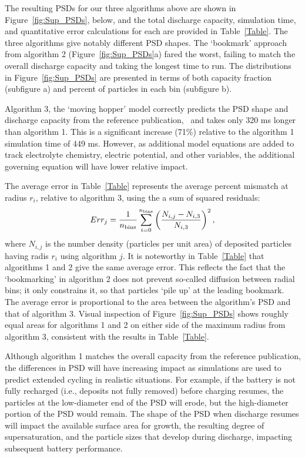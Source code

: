 \documentclass[final,3p,times,twocolumn, 12pt]{elsarticle}
\begin{document}
The resulting PSDs for our three algorithms above are shown in Figure~\ref{fig:Sup_PSDs}, below, and the total discharge capacity, simulation time, and quantitative error calculations for each are provided in Table~\ref{Table}. The three algorithms give notably different PSD shapes. The `bookmark' approach from algorithm 2 (Figure~\ref{fig:Sup_PSDs}a) fared the worst, failing to match the overall discharge capacity and taking the longest time to run.  The distributions in Figure~\ref{fig:Sup_PSDs} are presented in terms of both capacity fraction (subfigure a) and percent of particles in each bin (subfigure b).  

Algorithm 3, the `moving hopper' model correctly predicts the PSD shape and discharge capacity from the reference publication,~\cite{bib:Verify} and takes only 320 ms longer than algorithm 1. This is a significant increase (71\%) relative to the algorithm 1 simulation time of 449 ms. However, as additional model equations are added to track electrolyte chemistry, electric potential, and other  variables, the additional governing equation will have lower relative impact.

The average error in Table~\ref{Table} represents the average percent mismatch at radius $r_i$, relative to algorithm 3, using the a sum of squared residuals:
\begin{equation}
    Err_j = \frac{1}{n_{\rm bins}}\sum_{i=0}^{n_{\rm bins}} \left(\frac{N_{i,j} - N_{i,3}}{N_{i,3}}\right)^2,
\end{equation}
where $N_{i,j}$ is the number density (particles per unit area) of deposited particles having radis $r_i$ using algorithm $j$.  It is noteworthy in Table~\ref{Table} that algorithms 1 and 2 give the same average error.  This reflects the fact that the `bookmarking' in algorithm 2 does not prevent so-called diffusion between radial bins; it only constrains it, so that particles `pile up' at the leading bookmark.  The average error is proportional to the area between the algorithm's PSD and that of algorithm 3.  Visual inspection of Figure~\ref{fig:Sup_PSDs} shows roughly equal areas for algorithms 1 and 2 on either side of the maximum radius from algorithm 3, consistent with the results in Table~\ref{Table}.


Although algorithm 1 matches the overall capacity from the reference publication, the differences in PSD will have increasing impact as simulations are used to predict extended cycling in realistic situations. For example, if the battery is not fully recharged (i.e., deposits not fully removed) before charging resumes, the particles at the low-diameter end of the PSD will erode, but the high-diameter portion of the PSD would remain. The shape of the PSD when discharge resumes will impact the available surface area for growth, the resulting degree of supersaturation, and the particle sizes that develop during discharge, impacting subsequent battery performance.
\end{document}
